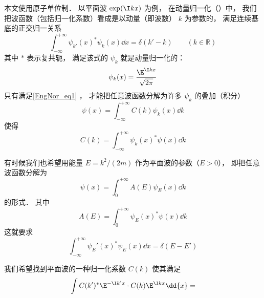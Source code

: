 
\begin{issues}
\issueDraft
\end{issues}


本文使用原子单位制． 以平面波 $\exp(\I kx)$ 为例， 在动量归一化（）中， 我们把波函数（包括归一化系数）看成是以动量（即波数） $k$ 为参数的， 满足连续基底的正交归一关系%
\begin{equation}\label{EngNor_eq1}
\int_{-\infty}^{+\infty} \psi_{k'}(x)^* \psi_{k}(x) \dd{x} = \delta(k' - k) \qquad (k \in \mathbb R)
\end{equation}
其中 $*$ 表示复共轭， 满足该式的 $\psi_k$ 就是动量归一化的：%
\begin{equation}
\psi_k(x) = \frac{\E^{\I kx}}{\sqrt{2\pi}}
\end{equation}
只有满足\autoref{EngNor_eq1} ， 才能把任意波函数分解为许多 $\psi_{k}$ 的叠加（积分）
\begin{equation}
\psi(x) = \int_{-\infty}^{+\infty} C(k)\psi_{k}(x) \dd{k}
\end{equation}
使得
\begin{equation}
C(k) = \int_{-\infty}^{+\infty} \psi_{k}(x)^* \psi(x) \dd{k}
\end{equation}

有时候我们也希望用能量 $E = k^2/(2m)$ 作为平面波的参数（$E > 0$）， 即把任意波函数分解为
\begin{equation}
\psi(x) = \int_{0}^{+\infty} A(E)\psi_E(x) \dd{k}
\end{equation}
的形式． 其中
\begin{equation}
A(E) = \int_{0}^{+\infty} \psi_E(x)^* \psi(x) \dd{k}
\end{equation}
这就要求
\begin{equation}
\int_{-\infty}^{+\infty} \psi_E'(x)^* \psi_E(x) \dd{ x} = \delta(E - E')
\end{equation}

我们希望找到平面波的一种归一化系数 $C(k)$ 使其满足
\begin{equation}
\int C(k')^* \E^{-\I k' x} \cdot C(k) \E^{\I kx} \dd{x} = 
\end{equation}

